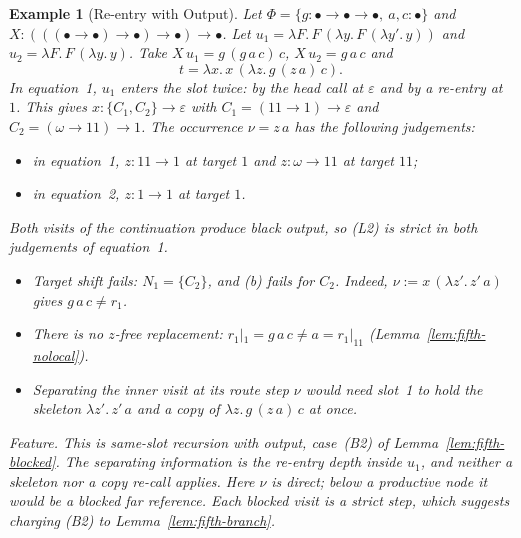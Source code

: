 \documentclass[10pt,a4paper]{article}
\theoremstyle{plain}%
\newtheorem{example}[theorem]{Example}
\begin{document}
\begin{example}[Re-entry with Output]\label{ex:ex-reentry}
Let $\Phi = \{g : \bullet\to\bullet\to\bullet,\ a,c : \bullet\}$ and $X : (((\bullet\to\bullet)\to\bullet)\to\bullet)\to\bullet$.
Let $u_1 = \lambda F.\,F\,(\lambda y.\,F\,(\lambda y'.\,y))$ and $u_2 = \lambda F.\,F\,(\lambda y.\,y)$.
Take $X\,u_1 = g\,(g\,a\,c)\,c$, $X\,u_2 = g\,a\,c$ and
\[
t = \lambda x.\,x\,(\lambda z.\,g\,(z\,a)\,c).
\]
In equation~1, $u_1$ enters the slot twice: by the head call at $\varepsilon$ and by a re-entry at $1$.
This gives $x : \{C_1, C_2\} \to \varepsilon$ with $C_1 = (11 \to 1) \to \varepsilon$ and $C_2 = (\omega \to 11) \to 1$.
The occurrence $\nu = z\,a$ has the following judgements:
\begin{itemize}
\item in equation~1, $z : 11 \to 1$ at target $1$ and $z : \omega \to 11$ at target $11$;
\item in equation~2, $z : 1 \to 1$ at target $1$.
\end{itemize}
Both visits of the continuation produce black output, so (L2) is strict in both judgements of equation~1.
\begin{itemize}
\item Target shift fails: $N_1 = \{C_2\}$, and (b) fails for $C_2$.
Indeed, $\nu := x\,(\lambda z'.\,z'\,a)$ gives $g\,a\,c \neq r_1$.
\item There is no $z$-free replacement: $r_1|_1 = g\,a\,c \neq a = r_1|_{11}$ (Lemma~\ref{lem:fifth-nolocal}).
\item Separating the inner visit at its route step $\nu$ would need slot~1 to hold the skeleton $\lambda z'.\,z'\,a$ and a copy of $\lambda z.\,g\,(z\,a)\,c$ at once.
\end{itemize}

\emph{Feature.}
This is same-slot recursion with output, case~(B2) of Lemma~\ref{lem:fifth-blocked}.
The separating information is the re-entry depth inside $u_1$, and neither a skeleton nor a copy re-call applies.
Here $\nu$ is direct; below a productive node it would be a blocked far reference.
Each blocked visit is a strict step, which suggests charging (B2) to Lemma~\ref{lem:fifth-branch}.
\end{example}
\end{document}
